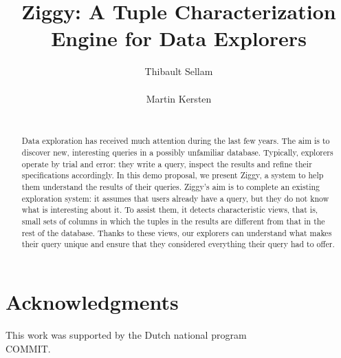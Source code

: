 \documentclass{vldb}
\begin{document}
\title{Ziggy: A Tuple Characterization Engine for Data Explorers}

\author{
\alignauthor
    Thibault Sellam\\
    \\
\alignauthor
Martin Kersten\\
    \\
}


\maketitle
\thispagestyle{empty}

\begin{abstract}
Data exploration has received much attention during the last few years. The
aim is to discover new, interesting queries in a possibly unfamiliar
database. Typically, explorers operate by trial and error: they write
a query, inspect the results and refine their specifications accordingly. In this
demo proposal, we present Ziggy, a system to help them understand the
results of their queries. Ziggy's aim is to complete an existing exploration system: it
assumes that users already have a query, but they do not know what is
interesting about it. To assist them, it detects characteristic views,
that is, small sets of columns in which the tuples in the results are different
from that in the rest of the database. Thanks to these views, our explorers
can understand what makes their query unique and ensure that they
considered everything their query had to offer.
\end{abstract}


\section{Acknowledgments}
This work was supported by the Dutch national program \\COMMIT.


\end{document}
